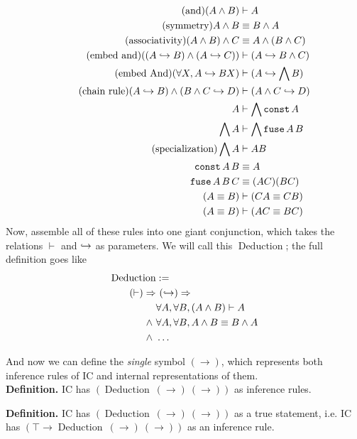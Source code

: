 \documentclass{article}
\begin{document}
  \begin{align*}
    \tag{and}
    (A \wedge B) &\vdash A\\
    \tag{symmetry}
    A \wedge B &\equiv B \wedge A\\
    \tag{associativity}
    (A \wedge B) \wedge C &\equiv A \wedge (B \wedge C)\\
    \tag{embed and}
    ((A \hookrightarrow B) \wedge (A \hookrightarrow C)) &\vdash (A \hookrightarrow B \wedge C)\\
    \tag{embed And}
    (\forall X, A \hookrightarrow B X) &\vdash (A \hookrightarrow \bigwedge B)\\
    \tag{chain rule}
    (A \hookrightarrow B) \wedge (B \wedge C \hookrightarrow D) &\vdash (A \wedge C \hookrightarrow D)\\
    A &\vdash \bigwedge \operatorname{\texttt{const}} A\\
    \bigwedge A &\vdash \bigwedge \operatorname{\texttt{fuse}} A\,B\\
    \tag{specialization}
    \bigwedge A &\vdash AB\\
    \operatorname{\texttt{const}} A\,B &\equiv A\\
    \operatorname{\texttt{fuse}} A\,B\,C &\equiv (AC)(BC)\\
    (A \equiv B) &\vdash (CA \equiv CB)\\
    (A \equiv B) &\vdash (AC \equiv BC)\\
  \end{align*}
  \newcommand{\deduction}{\operatorname{\mathrm{Deduction}}}
  Now, assemble all of these rules into one giant conjunction, which takes the relations $\vdash$ and $\hookrightarrow$ as parameters. We will call this $\deduction$; the full definition goes like
  \begin{align*}
    \deduction& :=\\
    \nameabst{(\vdash)}&\ \nameabst{(\objto)}\\
    &\forall A, \forall B, (A \wedge B) \vdash A\\
    \wedge\ &\forall A, \forall B, A \wedge B \equiv B \wedge A\\
    \wedge\ &\dots\\
  \end{align*}
  
  And now we can define the \emph{single} symbol $(\to)$, which represents both inference rules of IC and internal representations of them.
  \\
  
  \textbf{Definition.} IC has $(\deduction\ (\to)\ (\to))$ as inference rules.
  
  \textbf{Definition.} IC has $(\deduction\ (\to)\ (\to))$ as a true statement, i.e. IC has $(\top \to \deduction\ (\to)\ (\to))$ as an inference rule.
  \\
  
\end{document}
